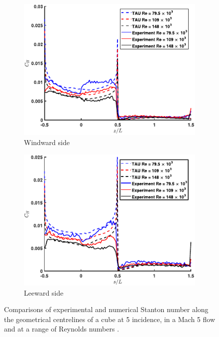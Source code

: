 \begin{figure}[ht]
    \centering
    \begin{subfigure}{0.49\textwidth}
        \includegraphics[width=\textwidth]{Images/2. Background/rees1.pdf}
        \caption{Windward side}
    \end{subfigure}
    \hfill
    \begin{subfigure}{0.49\textwidth}
        \includegraphics[width=\textwidth]{Images/2. Background/rees2.pdf}
        \caption{Leeward side}
    \end{subfigure}
    \caption{Comparisons of experimental and numerical Stanton number along the geometrical centrelines of a cube at \qty{5}{\deg} incidence, in a Mach 5 flow and at a range of Reynolds numbers \cite{rees}.}
    \label{fig:rees}
\end{figure}


